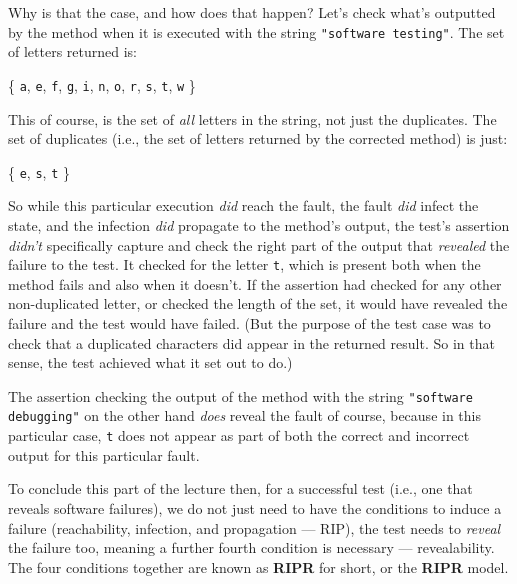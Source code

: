 Why is that the case, and how does that happen? Let's check what's outputted by
the method when it is executed with the string {\tt "software testing"}. The set
of letters returned is: 

\begin{center}
    \{ {\tt a}, {\tt e}, {\tt f}, {\tt g}, {\tt i}, {\tt n}, {\tt o}, {\tt r},
    {\tt s}, {\tt t}, {\tt w} \}
\end{center}

This of course, is the set of {\it all} letters in the string, not just the
duplicates. The set of duplicates (i.e., the set of letters returned by the
corrected method) is just:

\begin{center}
    \{ {\tt e}, {\tt s}, {\tt t} \}
\end{center}

So while this particular execution {\it did} reach the fault, the fault {\it
did} infect the state, and the infection {\it did} propagate to the method's
output, the test's assertion {\it didn't} specifically capture and check the
right part of the output that {\it revealed} the failure to the test. It checked
for the letter {\tt t}, which is present both when the method fails and also
when it doesn't. If the assertion had checked for any other non-duplicated
letter, or checked the length of the set, it would have revealed the failure and
the test would have failed. (But the purpose of the test case was to check that
a duplicated characters did appear in the returned result. So in that sense, the
test achieved what it set out to do.)

The assertion checking the output of the method with the string {\tt "software
debugging"} on the other hand {\it does} reveal the fault of course, because in
this particular case, {\tt t} does not appear as part of both the correct and
incorrect output for this particular fault. 


To conclude this part of the lecture then, for a successful test (i.e., one that
reveals software failures), we do not just need to have the conditions to induce
a failure (reachability, infection, and propagation --- RIP), the test needs to
{\it reveal} the failure too, meaning a further fourth condition is necessary
--- revealability. The four conditions together are known as {\bf RIPR} for
short, or the {\bf RIPR} model.

